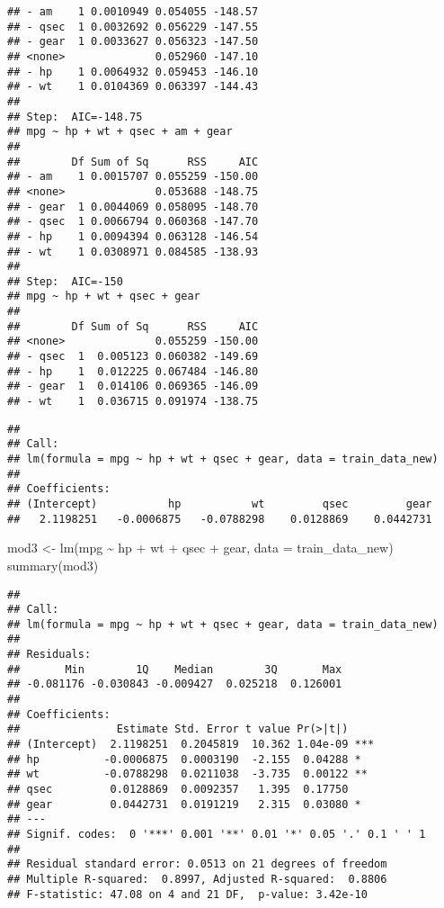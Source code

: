 \documentclass[
]{article}
\newenvironment{Shaded}{\begin{snugshade}}{\end{snugshade}}
\newcommand{\AttributeTok}[1]{\textcolor[rgb]{0.77,0.63,0.00}{#1}}
\newcommand{\FunctionTok}[1]{\textcolor[rgb]{0.00,0.00,0.00}{#1}}
\newcommand{\NormalTok}[1]{#1}
\newcommand{\OtherTok}[1]{\textcolor[rgb]{0.56,0.35,0.01}{#1}}
\newcommand{\SpecialCharTok}[1]{\textcolor[rgb]{0.00,0.00,0.00}{#1}}
\begin{document}
\begin{verbatim}
## - am    1 0.0010949 0.054055 -148.57
## - qsec  1 0.0032692 0.056229 -147.55
## - gear  1 0.0033627 0.056323 -147.50
## <none>              0.052960 -147.10
## - hp    1 0.0064932 0.059453 -146.10
## - wt    1 0.0104369 0.063397 -144.43
## 
## Step:  AIC=-148.75
## mpg ~ hp + wt + qsec + am + gear
## 
##        Df Sum of Sq      RSS     AIC
## - am    1 0.0015707 0.055259 -150.00
## <none>              0.053688 -148.75
## - gear  1 0.0044069 0.058095 -148.70
## - qsec  1 0.0066794 0.060368 -147.70
## - hp    1 0.0094394 0.063128 -146.54
## - wt    1 0.0308971 0.084585 -138.93
## 
## Step:  AIC=-150
## mpg ~ hp + wt + qsec + gear
## 
##        Df Sum of Sq      RSS     AIC
## <none>              0.055259 -150.00
## - qsec  1  0.005123 0.060382 -149.69
## - hp    1  0.012225 0.067484 -146.80
## - gear  1  0.014106 0.069365 -146.09
## - wt    1  0.036715 0.091974 -138.75
\end{verbatim}

\begin{verbatim}
## 
## Call:
## lm(formula = mpg ~ hp + wt + qsec + gear, data = train_data_new)
## 
## Coefficients:
## (Intercept)           hp           wt         qsec         gear  
##   2.1198251   -0.0006875   -0.0788298    0.0128869    0.0442731
\end{verbatim}

\begin{Shaded}
\begin{Highlighting}[]
\NormalTok{mod3 }\OtherTok{\textless{}{-}} \FunctionTok{lm}\NormalTok{(mpg }\SpecialCharTok{\textasciitilde{}}\NormalTok{ hp }\SpecialCharTok{+}\NormalTok{ wt }\SpecialCharTok{+}\NormalTok{ qsec }\SpecialCharTok{+}\NormalTok{ gear, }\AttributeTok{data =}\NormalTok{ train\_data\_new)}
\FunctionTok{summary}\NormalTok{(mod3)}
\end{Highlighting}
\end{Shaded}

\begin{verbatim}
## 
## Call:
## lm(formula = mpg ~ hp + wt + qsec + gear, data = train_data_new)
## 
## Residuals:
##       Min        1Q    Median        3Q       Max 
## -0.081176 -0.030843 -0.009427  0.025218  0.126001 
## 
## Coefficients:
##               Estimate Std. Error t value Pr(>|t|)    
## (Intercept)  2.1198251  0.2045819  10.362 1.04e-09 ***
## hp          -0.0006875  0.0003190  -2.155  0.04288 *  
## wt          -0.0788298  0.0211038  -3.735  0.00122 ** 
## qsec         0.0128869  0.0092357   1.395  0.17750    
## gear         0.0442731  0.0191219   2.315  0.03080 *  
## ---
## Signif. codes:  0 '***' 0.001 '**' 0.01 '*' 0.05 '.' 0.1 ' ' 1
## 
## Residual standard error: 0.0513 on 21 degrees of freedom
## Multiple R-squared:  0.8997, Adjusted R-squared:  0.8806 
## F-statistic: 47.08 on 4 and 21 DF,  p-value: 3.42e-10
\end{verbatim}
\end{document}
